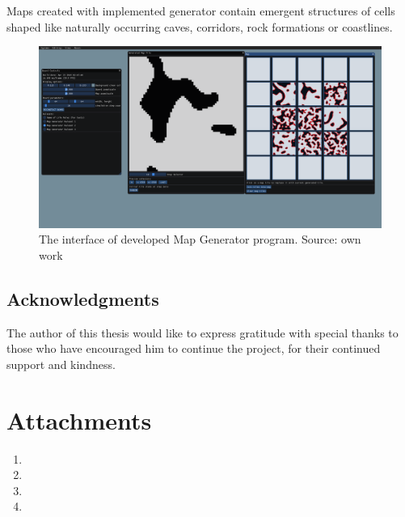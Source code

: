 \documentclass[12pt]{report}
\begin{document}
Maps created with implemented generator contain emergent structures of cells shaped like naturally occurring caves, corridors, rock formations or coastlines.
 
\begin{figure}[h]
	\centering
	\includegraphics[width=\linewidth]{images/interface_mapgen}
	\caption{The interface of developed Map Generator program. Source: own work}
	\label{fig:interfacemapgen}
\end{figure} 

\section{Acknowledgments}

The author of this thesis would like to express gratitude with special thanks to those who have encouraged him to continue the project, for their continued support and kindness.

\printbibliography[heading=bibintoc]

\listoffigures

\listoftables 

\chapter*{Attachments}
\begin{enumerate}  
	\item 
	\item 
	\item 
	\item
\end{enumerate} 
\end{document}
